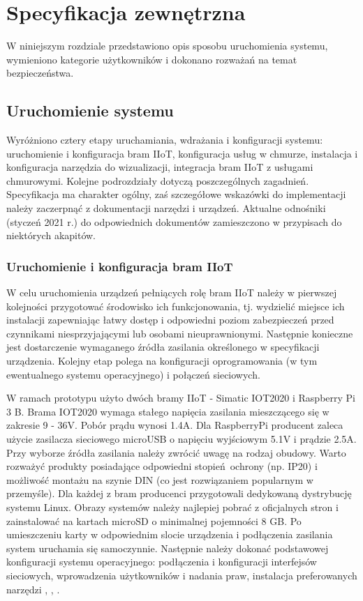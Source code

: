 \documentclass[a4paper, 12pt, twoside]{article}
\begin{document}
\section{Specyfikacja zewnętrzna}\label{spec-zew}

W niniejszym rozdziale przedstawiono opis sposobu uruchomienia systemu,
wymieniono kategorie użytkowników i dokonano rozważań na temat bezpieczeństwa.

\subsection{Uruchomienie systemu}

Wyróżniono cztery etapy uruchamiania, wdrażania i konfiguracji systemu:
uruchomienie i konfiguracja bram IIoT, konfiguracja usług w chmurze,
instalacja i konfiguracja narzędzia do wizualizacji, integracja bram 
IIoT z usługami chmurowymi. Kolejne podrozdziały dotyczą poszczególnych zagadnień.
Specyfikacja ma charakter ogólny, zaś szczegółowe wskazówki do implementacji
należy zaczerpnąć z dokumentacji narzędzi i urządzeń. Aktualne
odnośniki (styczeń 2021 r.) do odpowiednich
dokumentów zamieszczono w przypisach do niektórych akapitów.

\subsubsection{Uruchomienie i konfiguracja bram IIoT}

W celu uruchomienia urządzeń pełniących rolę bram IIoT należy w pierwszej
kolejności przygotować środowisko ich funkcjonowania, tj. wydzielić
miejsce ich instalacji zapewniając łatwy dostęp i odpowiedni poziom zabezpieczeń
przed czynnikami niesprzyjającymi lub osobami nieuprawnionymi. Następnie
konieczne jest dostarczenie wymaganego źródła zasilania określonego
w specyfikacji urządzenia. Kolejny etap polega na konfiguracji oprogramowania
(w tym ewentualnego systemu operacyjnego) i połączeń sieciowych.

W ramach prototypu użyto dwóch bramy IIoT - Simatic IOT2020 i Raspberry Pi 3 B.
Brama IOT2020 wymaga stałego napięcia zasilania mieszczącego się w zakresie 9 - 36V.
Pobór prądu wynosi 1.4A. Dla RaspberryPi producent zaleca użycie
zasilacza sieciowego microUSB o napięciu wyjściowym 5.1V i prądzie 2.5A.
Przy wyborze źródła zasilania należy zwrócić uwagę na rodzaj obudowy. Warto
rozważyć produkty posiadające odpowiedni stopień ochrony (np. IP20) i możliwość
montażu na szynie DIN (co jest rozwiązaniem popularnym w przemyśle).
Dla każdej z bram producenci przygotowali dedykowaną dystrybucję systemu Linux.
Obrazy systemów należy najlepiej pobrać z oficjalnych stron i zainstalować na kartach
microSD o minimalnej pojemności 8 GB. Po umieszczeniu karty w odpowiednim
slocie urządzenia i podłączenia zasilania system uruchamia się samoczynnie.
Następnie należy dokonać podstawowej konfiguracji systemu operacyjnego: podłączenia i konfiguracji interfejsów sieciowych,
wprowadzenia użytkowników i nadania praw, instalacja preferowanych narzędzi
\cite{simatic-iot-getting-started}, \cite{simatic-iot-sepc}, \cite{rpi-doc}.
\end{document}

